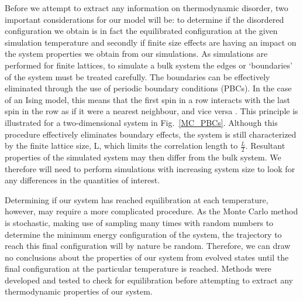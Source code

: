 \documentclass[11pt, twoside]{report}
\begin{document}
Before we attempt to extract any information on thermodynamic disorder, two important considerations for our model will be: to determine if the disordered configuration we obtain is in fact the equilibrated configuration at the given simulation temperature and secondly if finite size effects are having an impact on the system properties we obtain from our simulations.
As simulations are performed for finite lattices, to simulate a bulk system the edges or `boundaries' of the system must be treated carefully. The boundaries can be effectively eliminated through the use of periodic boundary conditions (PBCs). In the case of an Ising model, this means that the first spin in a row interacts with the last spin in the row as if it were a nearest neighbour, and vice versa \cite{MC_Landau}. This principle is illustrated for a two-dimensional system in Fig.~\ref{MC_PBCs}. Although this procedure effectively eliminates boundary effects, the system is still characterized by the finite lattice size, L, which limits the correlation length to $\frac{L}{2}$. Resultant properties of the simulated system may then differ from the bulk system. We therefore will need to perform simulations with increasing system size to look for any differences in the quantities of interest.

Determining if our system has reached equilibration at each temperature, however, may require a more complicated procedure. As the Monte Carlo method is stochastic, making use of sampling many times with random numbers to determine the minimum energy configuration of the system, the trajectory to reach this final configuration will by nature be random. Therefore, we can draw no conclusions about the properties of our system from evolved states until the final configuration at the particular temperature is reached. Methods were developed and tested to check for equilibration before attempting to extract any thermodynamic properties of our system.

\end{document}
